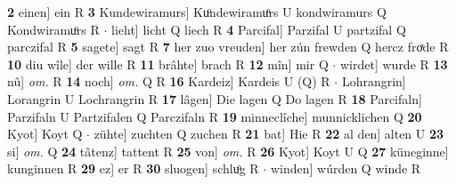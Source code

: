 \documentclass[8pt,a4paper,notitlepage]{article}
\begin{document}
\begin{table}[ht]
\begin{minipage}[t]{0.5\linewidth}
\textbf{2} einen] ein R \textbf{3} Kundewiramurs] Kuͦndewiramuͦrs U kondwiramurs Q Kondwiramuͦrs R  $\cdot$ lieht] licht Q liech R \textbf{4} Parcifal] Parzifal U partzifal Q parczifal R \textbf{5} sagete] sagt R \textbf{7} her zuo vreuden] her zún frewden Q hercz froͯde R \textbf{10} diu wîle] der wille R \textbf{11} brâhte] brach R \textbf{12} mîn] mir Q  $\cdot$ wirdet] wurde R \textbf{13} nû] \textit{om.} R \textbf{14} noch] \textit{om.} Q R \textbf{16} Kardeiz] Kardeis U (Q) R  $\cdot$ Lohrangrin] Lorangrin U Lochrangrin R \textbf{17} lâgen] Die lagen Q Do lagen R \textbf{18} Parcifaln] Parzifaln U Partzifalen Q Parczifaln R \textbf{19} minneclîche] munnicklichen Q \textbf{20} Kyot] Koyt Q  $\cdot$ zühte] zuchten Q zuchen R \textbf{21} bat] Hie R \textbf{22} al den] alten U \textbf{23} si] \textit{om.} Q \textbf{24} tâtenz] tattent R \textbf{25} von] \textit{om.} R \textbf{26} Kyot] Koyt U Q \textbf{27} küneginne] kunginnen R \textbf{29} ez] er R \textbf{30} sluogen] schluͦg R  $\cdot$ winden] wúrden Q winde R \newline
\end{minipage}
\end{table}
\end{document}

